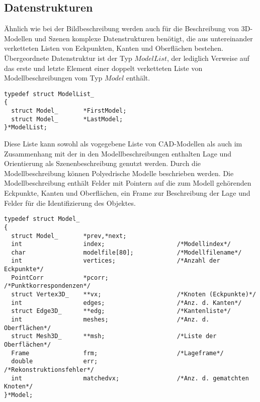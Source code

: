 \subsection{Datenstrukturen}

Ähnlich wie bei der Bildbeschreibung werden auch für die Beschreibung von
3D-Modellen und Szenen komplexe Datenstrukturen benötigt, die aus
untereinander verketteten Listen von Eckpunkten, Kanten und Oberflächen
bestehen. Übergeordnete Datenstruktur ist der Typ $ModelList$, der lediglich
Verweise auf das erste und letzte Element einer doppelt verketteten Liste von
Modellbeschreibungen vom Typ $Model$ enthält.
\begprogr\begin{verbatim}
typedef struct ModelList_
{
  struct Model_       *FirstModel;
  struct Model_       *LastModel;
}*ModelList;
\end{verbatim}\endprogr

Diese Liste kann sowohl als vogegebene Liste von CAD-Modellen als auch im
Zusammenhang mit der in den Modellbeschreibungen enthalten Lage und
Orientierung als Szenenbeschreibung genutzt werden. Durch die
Modellbeschreibung können Polyedrische Modelle beschrieben werden. Die
Modellbeschreibung enthält Felder mit Pointern auf die zum Modell gehörenden
Eckpunkte, Kanten und Oberflächen, ein Frame zur Beschreibung der Lage und
Felder für die Identifizierung des Objektes.
\begprogr\begin{verbatim}
typedef struct Model_
{
  struct Model_       *prev,*next;
  int                 index;                    /*Modellindex*/
  char                modelfile[80];            /*Modellfilename*/
  int                 vertices;                 /*Anzahl der Eckpunkte*/
  PointCorr           *pcorr;                   /*Punktkorrespondenzen*/
  struct Vertex3D_    **vx;                     /*Knoten (Eckpunkte)*/
  int                 edges;                    /*Anz. d. Kanten*/
  struct Edge3D_      **edg;                    /*Kantenliste*/
  int                 meshes;                   /*Anz. d. Oberflächen*/
  struct Mesh3D_      **msh;                    /*Liste der Oberflächen*/
  Frame               frm;                      /*Lageframe*/
  double              err;                      /*Rekonstruktionsfehler*/
  int                 matchedvx;                /*Anz. d. gematchten Knoten*/
}*Model;
\end{verbatim}\endprogr

